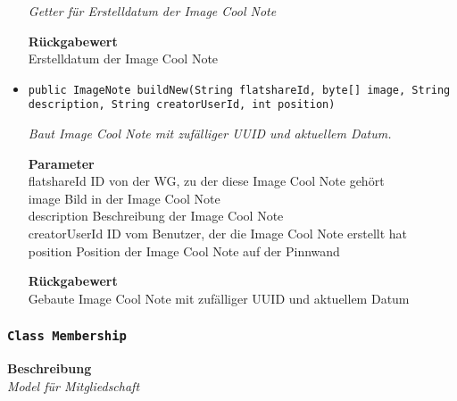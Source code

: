 \begin{itemize}
    	\textit{Getter für Erstelldatum der Image Cool Note}
    	
    	
    	
    	\textbf{Rückgabewert} \\
    	Erstelldatum der Image Cool Note        \item{\texttt{public ImageNote buildNew(String flatshareId, byte[] image, String description, String creatorUserId, int position)}}
    	
    	\textit{Baut Image Cool Note mit zufälliger UUID und aktuellem Datum.}
    	
    	\textbf{Parameter} \\
    	flatshareId ID von der WG, zu der diese Image Cool Note gehört\\
    	image Bild in der Image Cool Note\\
    	description Beschreibung der Image Cool Note\\
    	creatorUserId ID vom Benutzer, der die Image Cool Note erstellt hat\\
    	position Position der Image Cool Note auf der Pinnwand
    	
    	\textbf{Rückgabewert} \\
    	Gebaute Image Cool Note mit zufälliger UUID und aktuellem Datum
    \end{itemize}
    \subsubsection{\texttt{Class Membership}}
    \textbf{Beschreibung} \\
    \textit{Model für Mitgliedschaft}
